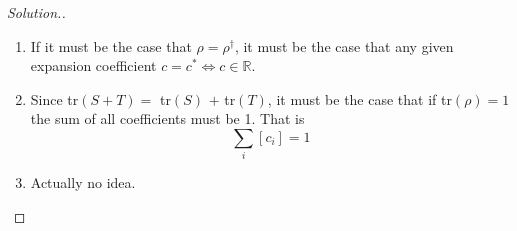 \documentclass[12pt]{article}
\begin{document}
\begin{proof}[Solution.]~\\
\begin{enumerate}[label=(\roman*)]
\item If it must be the case that $\rho=\rho^\dagger$, it must be the case that
any given expansion coefficient $c=c^*\iff c\in\mathbb{R}$.
\item Since tr$(S+T)=$ tr$(S)$ $+$ tr$(T)$, it must be the case that if
tr$(\rho)=1$ the sum of all coefficients must be 1. That is
$$\sum_i\left[c_i\right]=1$$
\item Actually no idea.
\end{enumerate}
\end{proof}
 
\end{document}
